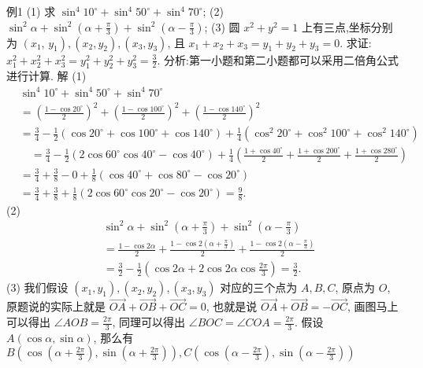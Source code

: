 例1 (1) 求 $\sin ^4 10^{\circ}+\sin ^4 50^{\circ}+\sin ^4 70^{\circ}$;
(2) $\sin ^2 \alpha+\sin ^2\left(\alpha+\frac{\pi}{3}\right)+\sin ^2\left(\alpha-\frac{\pi}{3}\right)$;
(3) 圆 $x^2+y^2=1$ 上有三点,坐标分别为 $\left(x_1\right.$, $\left.y_1\right),\left(x_2, y_2\right),\left(x_3, y_3\right)$, 且 $x_1+x_2+x_3=y_1+y_2+y_3=0$. 求证: $x_1^2+ x_2^2+x_3^2=y_1^2+y_2^2+y_3^2=\frac{3}{2}$.
分析:第一小题和第二小题都可以采用二倍角公式进行计算.
解 (1) 
$$
\begin{aligned}
& \sin ^4 10^{\circ}+\sin ^4 50^{\circ}+\sin ^4 70^{\circ} \\
& =\left(\frac{1-\cos 20^{\circ}}{2}\right)^2+\left(\frac{1-\cos 100^{\circ}}{2}\right)^2+\left(\frac{1-\cos 140^{\circ}}{2}\right)^2 \\
& =\frac{3}{4}-\frac{1}{2}\left(\cos 20^{\circ}+\cos 100^{\circ}+\cos 140^{\circ}\right)+\frac{1}{4}\left(\cos ^2 20^{\circ}+\cos ^2 100^{\circ}+\cos ^2 140^{\circ}\right) \\
& \quad=\frac{3}{4}-\frac{1}{2}\left(2 \cos 60^{\circ} \cos 40^{\circ}-\cos 40^{\circ}\right)+\frac{1}{4}\left(\frac{1+\cos 40^{\circ}}{2}+\frac{1+\cos 200^{\circ}}{2}+\frac{1+\cos 280^{\circ}}{2}\right) \\
& =\frac{3}{4}+\frac{3}{8}-0+\frac{1}{8}\left(\cos 40^{\circ}+\cos 80^{\circ}-\cos 20^{\circ}\right) \\
& =\frac{3}{4}+\frac{3}{8}+\frac{1}{8}\left(2 \cos 60^{\circ} \cos 20^{\circ}-\cos 20^{\circ}\right)=\frac{9}{8} .
\end{aligned}
$$
(2)
$$
\begin{aligned}
& \sin ^2 \alpha+\sin ^2\left(\alpha+\frac{\pi}{3}\right)+\sin ^2\left(\alpha-\frac{\pi}{3}\right) \\
& =\frac{1-\cos 2 \alpha}{2}+\frac{1-\cos 2\left(\alpha+\frac{\pi}{3}\right)}{2}+\frac{1-\cos 2\left(\alpha-\frac{\pi}{3}\right)}{2} \\
& =\frac{3}{2}-\frac{1}{2}\left(\cos 2 \alpha+2 \cos 2 \alpha \cos \frac{2 \pi}{3}\right)=\frac{3}{2} .
\end{aligned}
$$
(3) 我们假设 $\left(x_1, y_1\right),\left(x_2, y_2\right),\left(x_3, y_3\right)$ 对应的三个点为 $A, B, C$, 原点为 $O$, 原题说的实际上就是 $\overrightarrow{O A}+\overrightarrow{O B}+\overrightarrow{O C}=0$, 也就是说 $\overrightarrow{O A}+\overrightarrow{O B}=-\overrightarrow{O C}$, 
画图马上可以得出 $\angle A O B=\frac{2 \pi}{3}$, 同理可以得出 $\angle B O C=\angle C O A=\frac{2 \pi}{3}$.
假设 $A(\cos \alpha, \sin \alpha)$, 那么有 $B\left(\cos \left(\alpha+\frac{2 \pi}{3}\right), \sin \left(\alpha+\frac{2 \pi}{3}\right)\right), C(\cos (\alpha-\frac{2 \pi}{3}), \sin (\alpha-\frac{2 \pi}{3}))$
